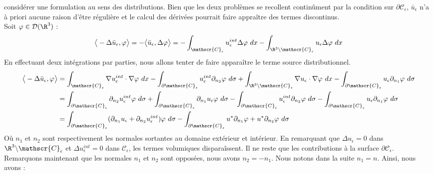 considérer une formulation au sens des distributions. Bien que les deux problèmes se recollent continûment par la condition sur $\partial \mathscr{C}_{\epsilon}$, $\bar{u}_{\epsilon}$ n'a à priori aucune raison d'être régulière et le calcul des dérivées pourrait faire appraître des termes discontinus. \\
Soit $\varphi \in \mathcal{D}(\R^3)$ :
\begin{align*}
    \big< -\Delta \bar{u}_{\epsilon}, \varphi \big> = -\big< \bar{u}_{\epsilon}, \Delta \varphi \big> = -\int_{\mathscr{C}_{\epsilon}} u_{\epsilon}^{int} \Delta \varphi \ dx - \int_{\R^3 \backslash \mathscr{C}_{\epsilon}} u_{\epsilon} \Delta \varphi \ dx
\end{align*}
En effectuant deux intégrations par parties, nous allons tenter de faire apparaître le terme source distributionnel.
\begin{align*}
    \big< -\Delta \bar{u}_{\epsilon}, \varphi \big> &= \int_{\mathscr{C}_{\epsilon}} \nabla u_{\epsilon}^{int} \cdot \nabla \varphi \ dx - \int_{\partial \mathscr{C}_{\epsilon}} u_{\epsilon}^{int} \partial_{n_{2}} \varphi \ d\sigma + \int_{\R^3 \backslash \mathscr{C}_{\epsilon}} \nabla u_{\epsilon} \cdot \nabla \varphi \ dx - \int_{\partial \mathscr{C}_{\epsilon}} u_{\epsilon} \partial_{n_{1}} \varphi \ d\sigma \\
    &= \int_{\partial \mathscr{C}_{\epsilon}} \partial_{n_2} u_{\epsilon}^{int} \varphi \ d\sigma + \int_{\partial \mathscr{C}_{\epsilon}} \partial_{n_1} u_{\epsilon} \varphi \ d\sigma  - \int_{\partial \mathscr{C}_{\epsilon}} u_{\epsilon}^{int} \partial_{n_{2}} \varphi \ d\sigma - \int_{\partial \mathscr{C}_{\epsilon}} u_{\epsilon} \partial_{n_{1}} \varphi \ d\sigma \\
    &= \int_{\partial \mathscr{C}_{\epsilon}} (\partial_{n_1} u_{\epsilon} + \partial_{n_2}u^{int}_{\epsilon})\varphi \ d\sigma - \int_{\partial \mathscr{C}_{\epsilon}} u^* \partial_{n_1}\varphi + u^* \partial_{n_2}\varphi \ d\sigma
\end{align*}
Où $n_1$ et $n_2$ sont respectivement les normales sortantes au domaine extérieur et intérieur.
En remarquant que $\Delta u_{\epsilon} = 0$ dans $\R^3 \backslash \mathscr{C}_{\epsilon}$ et $\Delta u_{\epsilon}^{int} = 0$ dans $\mathscr{C}_{\epsilon}$, les termes volumiques disparaîssent. Il ne reste que les contributions à la surface $\partial \mathscr{C}_{\epsilon}$.
Remarquons maintenant que les normales $n_1$ et $n_2$ sont opposées, nous avons $n_2 = - n_1$. Nous notons dans la suite $n_1 = n$. Ainsi, nous avons :

